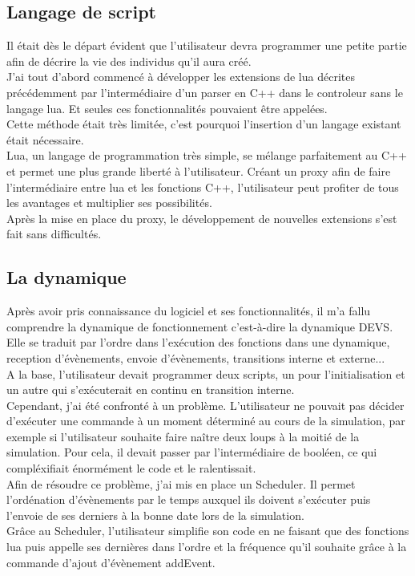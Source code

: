 \subsection{Langage de script}
Il était dès le départ évident que l'utilisateur devra programmer une petite partie afin de décrire la vie des individus qu'il aura créé.\\
J'ai tout d'abord commencé à développer les extensions de lua décrites précédemment par l'intermédiaire d'un parser en C++ dans le controleur sans le langage lua. Et seules ces fonctionnalités pouvaient être appelées.\\
Cette méthode était très limitée, c'est pourquoi l'insertion d'un langage existant était nécessaire.\\
Lua, un langage de programmation très simple, se mélange parfaitement au C++ et permet une plus grande liberté à l'utilisateur. Créant un proxy afin de faire l'intermédiaire entre lua et les fonctions C++, l'utilisateur peut profiter de tous les avantages et multiplier ses possibilités.\\
Après la mise en place du proxy, le développement de nouvelles extensions s'est fait sans difficultés.
\subsection{La dynamique}
Après avoir pris connaissance du logiciel et ses fonctionnalités, il m'a fallu comprendre la dynamique de fonctionnement c'est-à-dire la dynamique DEVS. Elle se traduit par l'ordre dans l'exécution des fonctions dans une dynamique, reception d'évènements, envoie d'évènements, transitions interne et externe...\\
A la base, l'utilisateur devait programmer deux scripts, un pour l'initialisation et un autre qui s'exécuterait en continu en transition interne. \\
Cependant, j'ai été confronté à un problème. L'utilisateur ne pouvait pas décider d'exécuter une commande à un moment déterminé au cours de la simulation, par exemple si l'utilisateur souhaite faire naître deux loups à la moitié de la simulation. Pour cela, il devait passer par l'intermédiaire de booléen, ce qui compléxifiait énormément le code et le ralentissait.\\
Afin de résoudre ce problème, j'ai mis en place un Scheduler. Il permet l'ordénation d'évènements par le temps auxquel ils doivent s'exécuter puis l'envoie de ses derniers à la bonne date lors de la simulation.\\
Grâce au Scheduler, l'utilisateur simplifie son code en ne faisant que des fonctions lua puis appelle ses dernières dans l'ordre et la fréquence qu'il souhaite grâce à la commande d'ajout d'évènement addEvent.
